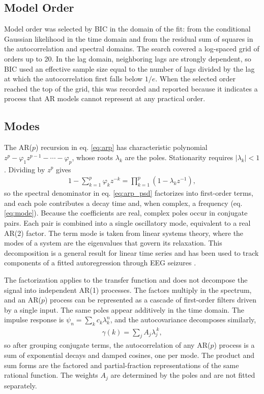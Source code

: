 \documentclass[pdflatex,lineno,sn-nature]{sn-jnl}
\theoremstyle{thmstyleone}
\theoremstyle{thmstyletwo}
\theoremstyle{thmstylethree}
\begin{document}
\subsection{Model Order}

Model order was selected by BIC \cite{schwarz_estimating_1978} in the domain of the fit: from the conditional Gaussian likelihood in the time domain and from the residual sum of squares in the autocorrelation and spectral domains. The search covered a log-spaced grid of orders up to 20. In the lag domain, neighboring lags are strongly dependent, so BIC used an effective sample size equal to the number of lags divided by the lag at which the autocorrelation first falls below $1/e$. When the selected order reached the top of the grid, this was recorded and reported because it indicates a process that AR models cannot represent at any practical order.

\subsection{Modes}

The AR($p$) recursion in eq. \ref{eq:arp} has characteristic polynomial $z^p - \varphi_1 z^{p-1} - \cdots - \varphi_p$, whose roots $\lambda_k$ are the poles. Stationarity requires $|\lambda_k| < 1$. Dividing by $z^p$ gives
\begin{align}
1 - \sum_{k=1}^{p} \varphi_k z^{-k} = \prod_{k=1}^{p} (1 - \lambda_k z^{-1}), \label{eq:factor}
\end{align}
so the spectral denominator in eq. \ref{eq:arp_psd} factorizes into first-order terms, and each pole contributes a decay time and, when complex, a frequency (eq. \ref{eq:mode}). Because the coefficients are real, complex poles occur in conjugate pairs. Each pair is combined into a single oscillatory mode, equivalent to a real AR(2) factor. The term mode is taken from linear systems theory, where the modes of a system are the eigenvalues that govern its relaxation. This decomposition is a general result for linear time series \cite{west_time_1997} and has been used to track components of a fitted autoregression through EEG seizures \cite{west_evaluation_1999}.

The factorization applies to the transfer function and does not decompose the signal into independent AR(1) processes. The factors multiply in the spectrum, and an AR($p$) process can be represented as a cascade of first-order filters driven by a single input. The same poles appear additively in the time domain. The impulse response is $\psi_n = \sum_k c_k \lambda_k^n$, and the autocovariance decomposes similarly,
\begin{align}
\gamma(k) = \sum_j A_j \lambda_j^{\,k}, \label{eq:acfmodes}
\end{align}
so after grouping conjugate terms, the autocorrelation of any AR($p$) process is a sum of exponential decays and damped cosines, one per mode. The product and sum forms are the factored and partial-fraction representations of the same rational function. The weights $A_j$ are determined by the poles and are not fitted separately.
\end{document}
